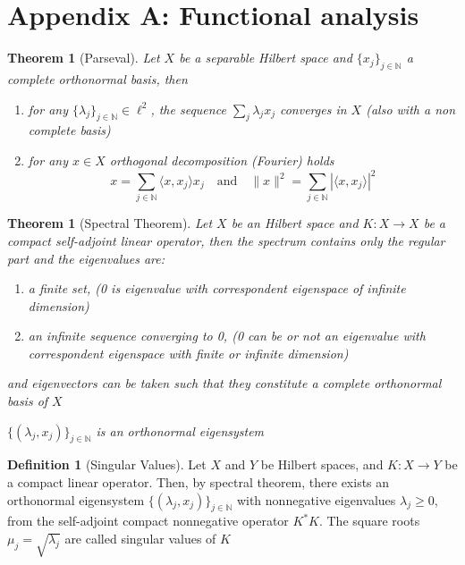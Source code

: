 \documentclass[10pt, a4paper, twoside, openright]{book}
\theoremstyle{definition}
\newtheorem{definition}[subsection]{Definition}
\theoremstyle{plain}
\newtheorem{theorem}[subsection]{Theorem}
\theoremstyle{plain}
\theoremstyle{plain}
\theoremstyle{plain}
\theoremstyle{plain}
\theoremstyle{plain}
\theoremstyle{plain}
\theoremstyle{plain}
\begin{document}
\section{Appendix A: Functional analysis}
\begin{theorem}[Parseval]
 Let $X$ be a separable Hilbert space and $\{x_j\}_{j\in\mathbb{N}}$ a complete orthonormal basis, then
 \begin{enumerate}
  \item for any $\{\lambda_j\}_{j\in\mathbb{N}} \in \ell ^2$, the sequence $\sum_{j}\lambda_jx_j$ converges in $X$ (also with a non complete basis)
  \item for any $x \in X$ orthogonal decomposition (Fourier) holds
  \begin{equation}
   x = \sum_{j \in \mathbb{N}} \langle x, x_j\rangle x_j \quad \text{and} \quad \|x\|^2=\sum_{j \in \mathbb{N}} |\langle x, x_j\rangle|^2
  \end{equation}
 \end{enumerate}
\end{theorem}

\begin{theorem}[Spectral Theorem]
 Let $X$ be an Hilbert space and $K:X\to X$ be a compact self-adjoint linear operator, then the spectrum contains only the regular part and the eigenvalues are:
 \begin{enumerate}
  \item a finite set, (0 is eigenvalue with correspondent eigenspace of infinite dimension)
  \item an infinite sequence converging to 0, (0 can be or not an eigenvalue with correspondent eigenspace with finite or infinite dimension)
 \end{enumerate}
 and eigenvectors can be taken such that they constitute a complete orthonormal basis of $X$
 \begin{center}
  $\{(\lambda_j, x_j)\}_{j\in\mathbb{N}}$ is an orthonormal eigensystem
 \end{center}
\end{theorem}

\begin{definition}[Singular Values]
 Let $X$ and $Y$ be Hilbert spaces, and $K:X\to Y$ be a compact linear operator. Then, by spectral theorem, there exists an orthonormal eigensystem $\{(\lambda_j,x_j)\}_{j\in\mathbb{N}}$ with nonnegative eigenvalues $\lambda_j \geq 0$, from the self-adjoint compact nonnegative operator $K^*K$. The square roots $\mu_j = \sqrt{\lambda_j}$ are called singular values of $K$
\end{definition}
\end{document}
